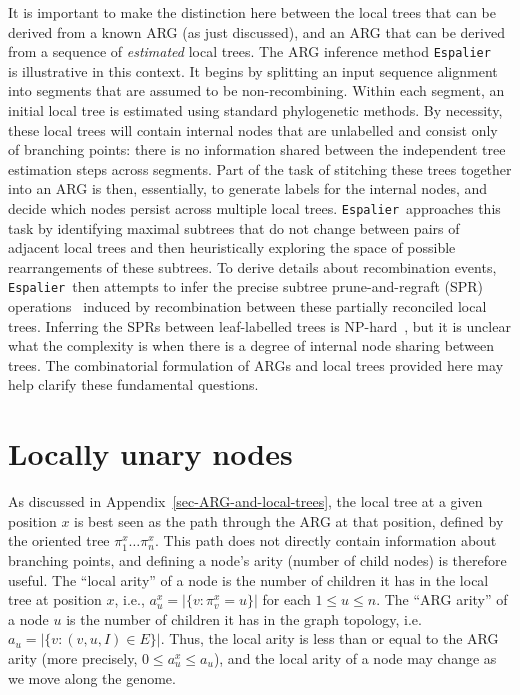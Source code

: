 \documentclass{article}
\newcommand{\espalier}[0]{\texttt{Espalier}}
\newcommand{\arbores}[0]{\texttt{Arbores}}
\begin{document}
It is important to make the distinction here between the local
trees that can be derived from a known ARG (as just discussed),
and an ARG that can be derived from a sequence of \emph{estimated}
local trees.
The ARG inference method
\espalier~\citep{rasmussen2022espalier} is illustrative in this context.
It begins by splitting an input sequence alignment into
segments that are assumed to be non-recombining. Within
each segment, an initial local tree is estimated using
standard phylogenetic methods. By necessity, these local
trees will contain internal nodes that are unlabelled and
consist only of branching points: there is no information
shared between the independent tree estimation steps
across segments. Part of the task of stitching
these trees together
into an ARG is then, essentially, to generate labels for
the internal nodes, and decide which nodes persist
across multiple local trees.
\espalier\ approaches this task
by identifying maximal subtrees
that do not change between pairs of adjacent
local trees and then
heuristically exploring the space of possible
rearrangements of these subtrees.
To derive details about recombination events,
\espalier\ then attempts to infer
the precise subtree prune-and-regraft (SPR)
operations~\citep{hein1990reconstructing,song2003on,song2006properties}
induced by recombination between these partially reconciled local trees.
Inferring the SPRs between leaf-labelled trees is
NP-hard~\citep{hein1996complexity,allen2001subtree,bordewich2005computational},
but it is unclear what the complexity is when there
is a degree of internal node sharing between trees.
The combinatorial formulation of ARGs and local trees provided here
may help clarify these fundamental questions.


\section{Locally unary nodes}
\label{sec-locally-unary-edges}
As discussed in Appendix~\ref{sec-ARG-and-local-trees}, the local tree at a given position
$x$ is best seen as the path through the ARG at that position, defined
by the oriented tree $\pi^x_1\dots\pi^x_n$. This path does not directly
contain information about branching points, and defining a
node's arity (number of child nodes) is therefore useful.
The ``local arity'' of a node is the number of children it has
in the local tree at position $x$, i.e., $a^x_u = |\{v : \pi^x_v = u\}|$
for each $1 \leq u \leq n$. The ``ARG arity'' of a node $u$ is the
number of children it has in the graph topology, i.e.\
$a_u = |\{v: (v, u, I) \in E\}|$. Thus, the local arity is less than
or equal to the ARG arity (more precisely, $0 \leq a^x_u \leq a_u$),
and the local arity of a node may change as we move along the genome.
\end{document}

